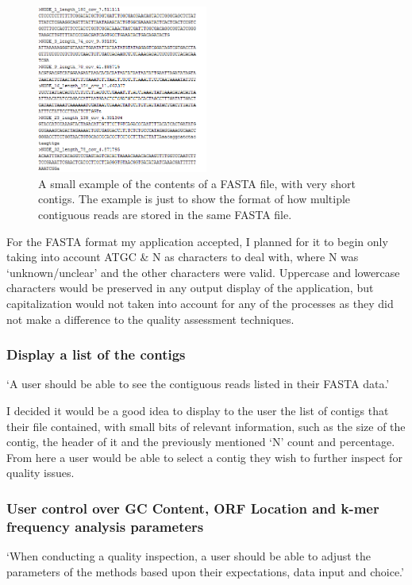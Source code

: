\begin{figure}[H]
\centering
\includegraphics[width=0.5\textwidth]{images/fastaexample}
\caption{A small example of the contents of a FASTA file, with very short contigs. The example is just to show the format of how multiple contiguous reads are stored in the same FASTA file.}
\end{figure}

For the FASTA format my application accepted, I planned for it to begin only taking into account ATGC \& N as characters to deal with, where N was `unknown/unclear' and the other characters were valid. Uppercase and lowercase characters would be preserved in any output display of the application, but capitalization would not taken into account for any of the processes as they did not make a difference to the quality assessment techniques.

\subsubsection{Display a list of the contigs}
`A user should be able to see the contiguous reads listed in their FASTA data.'

I decided it would be a good idea to display to the user the list of contigs that their file contained, with small bits of relevant information, such as the size of the contig, the header of it and the previously mentioned `N' count and percentage. From here a user would be able to select a contig they wish to further inspect for quality issues.

\subsubsection{User control over GC Content, ORF Location and k-mer frequency analysis parameters}
`When conducting a quality inspection, a user should be able to adjust the parameters of the methods based upon their expectations, data input and choice.'

